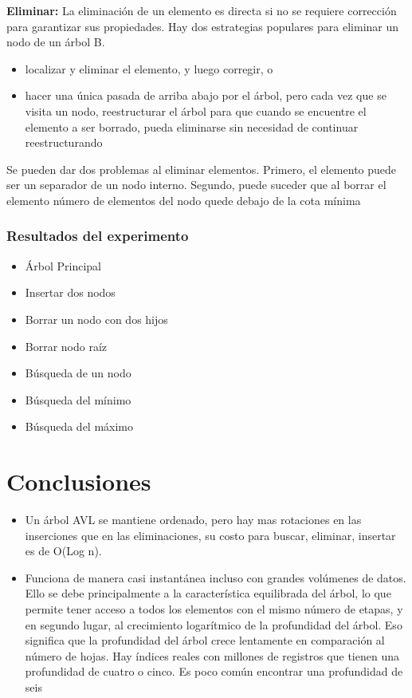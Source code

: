 \documentclass{article}
\begin{document}
                \textbf{Eliminar:}
                La eliminación de un elemento es directa si no se requiere corrección para garantizar sus propiedades. Hay dos estrategias populares para eliminar un nodo de un árbol B.
                \begin{itemize}
                  \item localizar y eliminar el elemento, y luego corregir, o
                  \item hacer una única pasada de arriba abajo por el árbol, pero cada vez que se visita un nodo, reestructurar el árbol para que cuando se encuentre el elemento a ser borrado, pueda eliminarse sin necesidad de continuar reestructurando
                \end{itemize}
                Se pueden dar dos problemas al eliminar elementos. Primero, el elemento puede ser un separador de un nodo interno. Segundo, puede suceder que al borrar el elemento número de elementos del nodo quede debajo de la cota mínima

            \subsubsection{Resultados del experimento}

        \begin{itemize}
            \item   Árbol Principal
            \item   Insertar dos nodos
            \item   Borrar un nodo con dos hijos
            \item   Borrar nodo raíz
            \item   Búsqueda de un nodo
            \item	Búsqueda del mínimo
            \item	Búsqueda del máximo
        \end{itemize}
    \section{Conclusiones}
        \begin{itemize}
                 \item Un árbol AVL se mantiene ordenado, pero hay mas rotaciones en las inserciones que en las eliminaciones, su costo para buscar, eliminar, insertar  es de O(Log n).
                 \item Funciona de manera casi instantánea incluso con grandes volúmenes de datos. Ello se debe principalmente a la característica equilibrada del árbol, lo que permite tener acceso a todos los elementos con el mismo número de etapas, y en segundo lugar, al crecimiento logarítmico de la profundidad del árbol. Eso significa que la profundidad del árbol crece lentamente en comparación al número de hojas. Hay índices reales con millones de registros que tienen una profundidad de cuatro o cinco. Es poco común encontrar una profundidad de seis
        \end{itemize}
\end{document}
